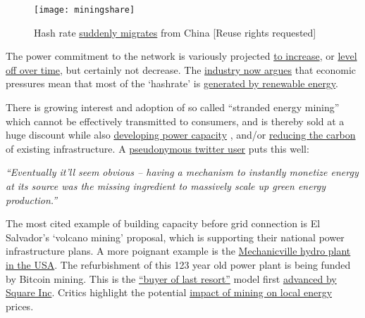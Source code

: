 \begin{figure}
  \centering
    \texttt{[image: miningshare]}
  \caption{Hash rate \href{https://ccaf.io/cbeci/ining_map}{suddenly migrates} from China [Reuse rights requested]}
  \label{fig:miningshare}
\end{figure}
The power commitment to the network is variously projected \href{https://www.nature.com/articles/s41558-018-0321-8}{to increase}, or \href{https://assets.website-files.com/614e11526f6630959fc98679/616df63a27a7ec339f5e6a80_NYDIG-BitcoinNetZero_SML.pdf}{level off over time}, but certainly not decrease. The \href{https://www.forbes.com/sites/martinrivers/2022/04/03/is-bitcoin-really-that-bad-for-the-environment/?sh=6a3203427143}{industry now argues} that economic pressures mean that most of the `hashrate' is \href{https://bitcoinminingcouncil.com/q4-bitcoin-mining-council-survey-confirms-sustainable-power-mix-and-technological-efficiency/}{generated by renewable energy}\cite{blandin20203rd}.\par 
There is growing interest and adoption of so called ``stranded energy mining''  which cannot be effectively transmitted to consumers, and is thereby sold at a huge discount while also \href{https://www.renewableenergyworld.com/wind-power/900mw-wind-farm-to-power-bitcoin-mining-operation/}{developing power capacity} \cite{bastian2021hedging}, and/or \href{https://www.bloomberg.com/news/articles/2022-03-24/exxon-considers-taking-gas-to-bitcoin-pilot-to-four-countries}{reducing the carbon} of existing infrastructure. A \href{https://twitter.com/thelaserlife/status/1511354396705452035}{pseudonymous twitter user} puts this well:\par 
\textit{``Eventually it'll seem obvious – having a mechanism to instantly monetize energy at its source was the missing ingredient to massively scale up green energy production.''}\par
The most cited example of building capacity before grid connection is El Salvador's `volcano mining' proposal, which is supporting their national power infrastructure plans. A more poignant example is the \href{https://www.timesunion.com/news/article/Mechanicville-hydro-plant-gets-new-life-16299115.php}{Mechanicville hydro plant in the USA}. The refurbishment of this 123 year old power plant is being funded by Bitcoin mining. This is the \href{https://www.lynalden.com/bitcoin-energy/}{``buyer of last resort''} model first \href{https://squareup.com/us/en/press/bcei-white-paper}{advanced by Square Inc}. Critics highlight the potential \href{https://www.fitchratings.com/research/us-public-finance/crypto-mining-poses-challenges-to-public-power-utilities-24-01-2022}{impact of mining on local energy} prices\cite{benetton2021cryptomining}.\par
